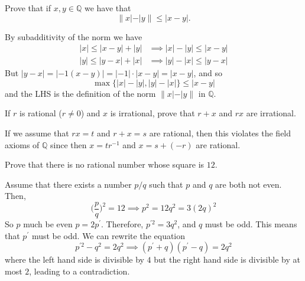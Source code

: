   \begin{exercise}
    Prove that if $x, y \in \mathbb{Q}$ we have that
    \begin{equation}
      \|x| - |y\| \leq |x - y|.
    \end{equation}
  \end{exercise}
  \begin{solution}
    By subadditivity of the norm we have 
    \begin{align}
      |x| \leq |x - y| + |y| & \implies |x| - |y| \leq |x - y| \\
      |y| \leq |y - x| + |x| & \implies |y| - |x| \leq |y - x| 
    \end{align}
    But $|y - x| = |-1 (x - y)| = |-1| \cdot |x - y| = |x - y|$, and so 
    \begin{equation}
      \max\{ |x| - |y|, |y| - |x| \} \leq |x - y|
    \end{equation}
    and the LHS is the definition of the norm $\|x| - |y\|$ in $\mathbb{Q}$. 
  \end{solution}

  \begin{exercise}[Rudin 1.1]
    If $r$ is rational ($r \neq 0$) and $x$ is irrational, prove that $r + x$ and $rx$ are irrational. 
  \end{exercise}
  \begin{solution}
    If we assume that $r x = t$ and $r + x = s$ are rational, then this violates the field axioms of $\mathbb{Q}$ since then $x = t r^{-1}$ and $x = s + (-r)$ are rational. 
  \end{solution}

  \begin{exercise}[Rudin 1.2]
    Prove that there is no rational number whose square is $12$. 
  \end{exercise}
  \begin{solution}
    Assume that there exists a number $p/q$ such that $p$ and $q$ are both not even. Then, 
    \begin{equation}
      \bigg( \frac{p}{q} \bigg)^2 = 12 \implies p^2 = 12q^2 = 3 (2 q)^2
    \end{equation}
    So $p$ much be even $p = 2 p^\prime$. Therefore, $p^{\prime 2} = 3 q^2$, and $q$ must be odd. This means that $p^\prime$ must be odd. We can rewrite the equation 
    \begin{equation}
      p^{\prime 2} - q^2 = 2 q^2 \implies (p^\prime + q) (p^\prime - q) = 2q^2
    \end{equation}
    where the left hand side is divisible by $4$ but the right hand side is divisible by at most $2$, leading to a contradiction. 
  \end{solution}

